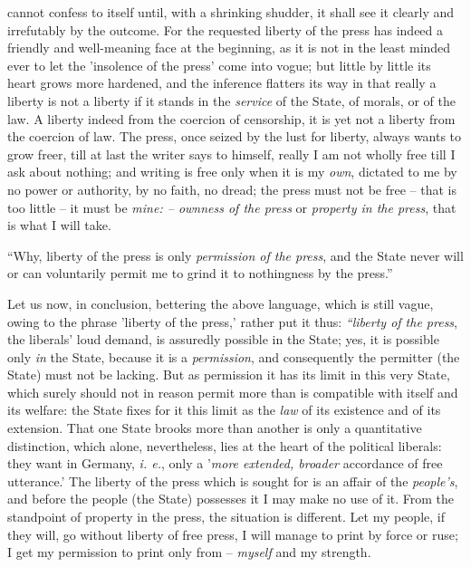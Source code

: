 \documentclass[12pt,a4paper]{book}
\begin{document}
cannot confess to itself until, with a shrinking shudder, it shall see it 
clearly and irrefutably by the outcome. For the requested liberty of the press 
has indeed a friendly and well-meaning face at the beginning, as it is not in 
the least minded ever to let the 'insolence of the press' come into vogue; but 
little by little its heart grows more hardened, and the inference flatters its 
way in that really a liberty is not a liberty if it stands in the 
\textit{service} of the State, of morals, or of the law. A liberty indeed from 
the coercion of censorship, it is yet not a liberty from the coercion of law. 
The press, once seized by the lust for liberty, always wants to grow freer, 
till at last the writer says to himself, really I am not wholly free till I 
ask about nothing; and writing is free only when it is my \textit{own}, 
dictated to me by no power or authority, by no faith, no dread; the press must 
not be free -- that is too little -- it must be \textit{mine: -- ownness of 
the press} or \textit{property in the press}, that is what I will take.

``Why, liberty of the press is only \textit{permission of the press}, and the 
State never will or can voluntarily permit me to grind it to nothingness by 
the press.''

Let us now, in conclusion, bettering the above language, which is still vague, 
owing to the phrase 'liberty of the press,' rather put it thus: 
\textit{``liberty of the press}, the liberals' loud demand, is assuredly 
possible in the State; yes, it is possible only \textit{in} the State, because 
it is a \textit{permission}, and consequently the permitter (the State) must 
not be lacking. But as permission it has its limit in this very State, which 
surely should not in reason permit more than is compatible with itself and its 
welfare: the State fixes for it this limit as the \textit{law} of its 
existence and of its extension. That one State brooks more than another is 
only a quantitative distinction, which alone, nevertheless, lies at the heart 
of the political liberals: they want in Germany, \textit{i. e.}, only a 
'\textit{more extended, broader} accordance of free utterance.' The liberty of 
the press which is sought for is an affair of the \textit{people's}, and 
before the people (the State) possesses it I may make no use of it. From the 
standpoint of property in the press, the situation is different. Let my 
people, if they will, go without liberty of free press, I will manage to print 
by force or ruse; I get my permission to print only from -- \textit{myself} 
and my strength.
\end{document}
